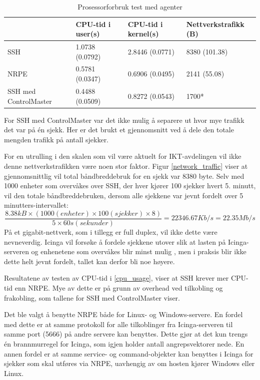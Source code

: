 \begin{table}
    \begin{center}
	\begin{threeparttable}
    \begin{tabular}{| l | l | l | l |} \hline
	\ & \textbf{CPU-tid i user(s)} & \textbf{CPU-tid i kernel(s)} & \textbf{Nettverkstrafikk (B)} \\ \hline
	SSH & 1.0738 (0.0792) & 2.8446 (0.0771) & 8380 (101.38) \\ \hline
	NRPE & 0.5781 (0.0347) & 0.6906 (0.0495) & 2141 (55.08) \\ \hline
	SSH med ControlMaster & 0.4488 (0.0509) & 0.8272 (0.0543) & 1700* \\ \hline
	\end{tabular}
	\begin{tablenotes}
	\small
	\item *For SSH med ControlMaster var det ikke mulig å separere ut hvor mye trafikk det var på én sjekk. Her er det brukt et gjennomsnitt ved å dele den totale mengden trafikk på antall sjekker.
	\end{tablenotes}
	\caption{Prosessorforbruk test med agenter}
	\label{agentcheck}
	\end{threeparttable}
	\end{center}
\end{table}
For en utrulling i den skalen som vil være aktuelt for IKT-avdelingen vil ikke denne nettverkstrafikken være noen stor faktor. Figur \ref{network_traffic} viser at gjennomsnittlig vil total båndbreddebruk for en sjekk var 8380 byte. Selv med 1000 enheter som overvåkes over SSH, der hver kjører 100 sjekker hvert 5. minutt, vil den totale båndbreddebruken, dersom alle sjekkene var jevnt fordelt over 5 minutters-intervallet:
\begin{equation}
\frac{8.38kB\times(1000(enheter)\times100(sjekker)\times8)}{5\times60s (sekunder)}=22346.67Kb/s = 22.35Mb/s
\end{equation}
På et gigabit-nettverk, som i tillegg er full duplex, vil ikke dette være nevneverdig. Icinga vil forsøke å fordele sjekkene utover slik at lasten på Icinga-serveren og enhenetene som overvåkes blir minst mulig \cite{icingascheduling}, men i praksis blir ikke dette helt jevnt fordelt, tallet kan derfor bli noe høyere.

Resultatene av testen av CPU-tid i \ref{cpu_usage}, viser at SSH krever mer CPU-tid enn NRPE. Mye av dette er på grunn av overhead ved tilkobling og frakobling, som tallene for SSH med ControlMaster viser. 

Det ble valgt å benytte NRPE både for Linux- og Windows-servere. En fordel med dette er at samme protokoll for alle tilkoblinger fra Icinga-serveren til samme port (5666) på andre servere kan benyttes. Dette gjør at det kun trengs én brannmurregel for Icinga, som igjen holder antall angrepsvektorer nede. En annen fordel er at samme service- og command-objekter kan benyttes i Icinga for sjekker som skal utføres via NRPE, uavhengig av om hosten kjører Windows eller Linux.
